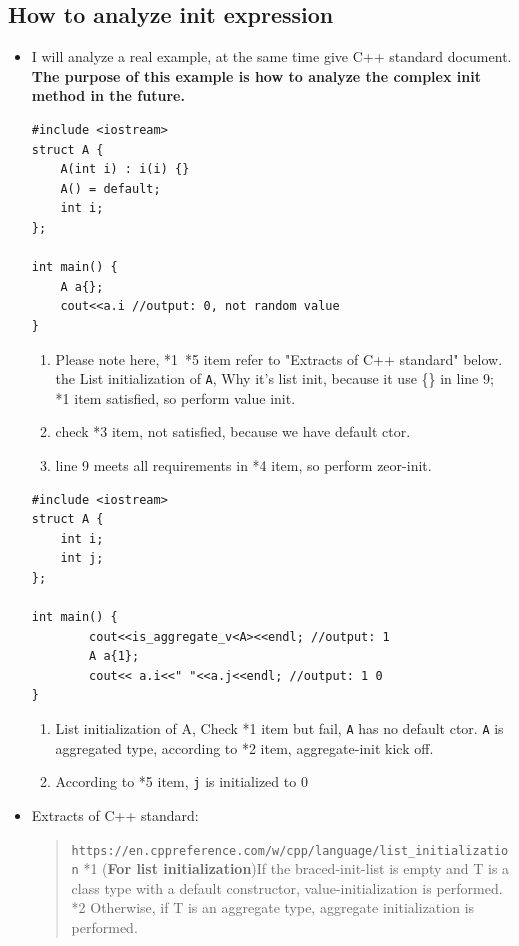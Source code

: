 \documentclass[a4paper,11pt,twoside]{book}
\begin{document}
\subsection{How to analyze init expression}
\begin{itemize}
	\item I will analyze a real example, at the same time give C++ standard document. \textbf{The purpose of this example is how to analyze the complex init method in the future.}
\begin{lstlisting}
#include <iostream>
struct A {
	A(int i) : i(i) {}
	A() = default;
	int i;
};
		
int main() {
	A a{};
	cout<<a.i //output: 0, not random value
}
\end{lstlisting}
	
	\begin{enumerate}
		\item Please note here, *1~*5 item refer to "Extracts of C++ standard" below. the List initialization of \texttt{A}, Why it's list init, because it use \{\} in line 9; *1 item satisfied, so perform value init. 
		
		\item check *3 item, not satisfied, because we have default ctor. 
		
		\item line 9 meets all requirements in *4 item, so perform zeor-init.

	\end{enumerate}
	
	
\begin{lstlisting}
#include <iostream>
struct A {
	int i;
	int j;
};
	
int main() {
		cout<<is_aggregate_v<A><<endl; //output: 1
		A a{1};
		cout<< a.i<<" "<<a.j<<endl; //output: 1 0
}
	\end{lstlisting}
	
	\begin{enumerate}
		\item List initialization of A, Check *1 item but fail, \texttt{A} has no default ctor. \texttt{A} is aggregated type, according to *2 item, aggregate-init kick off.
		
		\item According to *5 item, \texttt{j} is initialized to 0		
	\end{enumerate}
	
	
	\item  Extracts of C++ standard: 
	
	\begin{quote}
		\verb|https://en.cppreference.com/w/cpp/language/list_initialization| \newline
		*1 (\textbf{For list initialization})If the braced-init-list is empty and T is a class type with a default constructor, value-initialization is performed. 
		\newline
		*2 Otherwise, if T is an aggregate type, aggregate initialization is performed.
		\newline
		 \newline
		

\end{quote}
\end{itemize}
\end{document}
